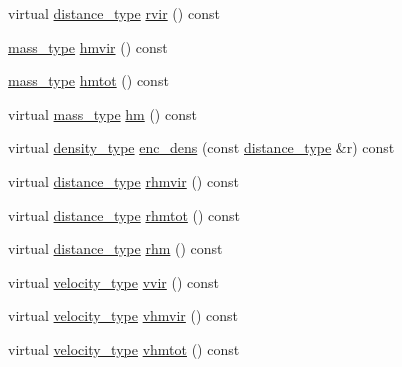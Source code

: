 \begin{DoxyCompactItemize}
\item 
virtual \hyperlink{namespaceIceBRG_a45499647eb87e24c10ab32c628711cec}{distance\+\_\+type} \hyperlink{classIceBRG_1_1density__profile_a34312cb028a2c481cb72224a12b4a287}{rvir} () const 
\item 
\hyperlink{namespaceIceBRG_a1be72ac4918a9b029f2eefa084213e35}{mass\+\_\+type} \hyperlink{classIceBRG_1_1density__profile_ad4d6e483327bfd378fc74b0e2e7b72f3}{hmvir} () const 
\item 
\hyperlink{namespaceIceBRG_a1be72ac4918a9b029f2eefa084213e35}{mass\+\_\+type} \hyperlink{classIceBRG_1_1density__profile_ad3f33f3d21729121e3752cc505622afb}{hmtot} () const 
\item 
virtual \hyperlink{namespaceIceBRG_a1be72ac4918a9b029f2eefa084213e35}{mass\+\_\+type} \hyperlink{classIceBRG_1_1density__profile_afaf5718b4786ef793ace33f9ea861444}{hm} () const 
\item 
virtual \hyperlink{namespaceIceBRG_a9f5e5cdd641bb4c06f7305dfb5ae0238}{density\+\_\+type} \hyperlink{classIceBRG_1_1density__profile_abe453f2128f3ee4030092e20b8c6e380}{enc\+\_\+dens} (const \hyperlink{namespaceIceBRG_a45499647eb87e24c10ab32c628711cec}{distance\+\_\+type} \&r) const 
\item 
virtual \hyperlink{namespaceIceBRG_a45499647eb87e24c10ab32c628711cec}{distance\+\_\+type} \hyperlink{classIceBRG_1_1density__profile_a6cd236235c8d36ec6de5cbcdce4cc57b}{rhmvir} () const 
\item 
virtual \hyperlink{namespaceIceBRG_a45499647eb87e24c10ab32c628711cec}{distance\+\_\+type} \hyperlink{classIceBRG_1_1density__profile_a99f066c6b0b737eb0be438d485cfc105}{rhmtot} () const 
\item 
virtual \hyperlink{namespaceIceBRG_a45499647eb87e24c10ab32c628711cec}{distance\+\_\+type} \hyperlink{classIceBRG_1_1density__profile_a20faa531d9db7d917939d598693372d7}{rhm} () const 
\item 
virtual \hyperlink{namespaceIceBRG_a34f8ef3b46f3408301e3c28197095eff}{velocity\+\_\+type} \hyperlink{classIceBRG_1_1density__profile_a09dec0ec4468e10e87b7b30f2069c108}{vvir} () const 
\item 
virtual \hyperlink{namespaceIceBRG_a34f8ef3b46f3408301e3c28197095eff}{velocity\+\_\+type} \hyperlink{classIceBRG_1_1density__profile_a5f4ceb70b5af5c816f25f08a62c50b89}{vhmvir} () const 
\item 
virtual \hyperlink{namespaceIceBRG_a34f8ef3b46f3408301e3c28197095eff}{velocity\+\_\+type} \hyperlink{classIceBRG_1_1density__profile_aa6a6bcba29d629b5d711e6141ecafd7a}{vhmtot} () const 

\end{DoxyCompactItemize}
